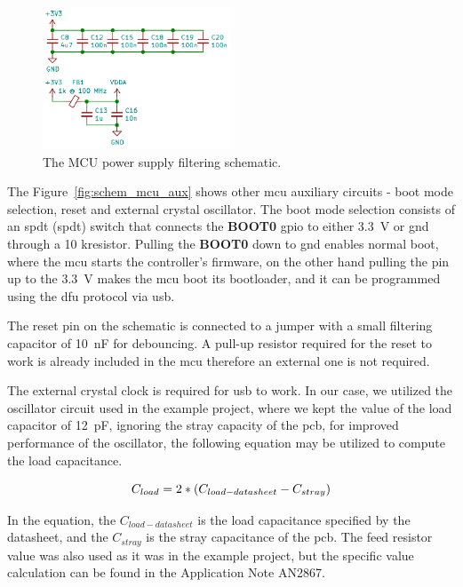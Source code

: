 \begin{figure}[H]
    \centering
    \includegraphics[width=0.5\textwidth]{obrazky/schem_mcu_power_filter}
    \caption{The MCU power supply filtering schematic.}
    \label{fig:schem_mcu_power}
\end{figure}

The Figure~\ref{fig:schem_mcu_aux} shows other \acs{mcu} auxiliary circuits - boot mode selection, reset and external crystal oscillator.
The boot mode selection consists of an \acs{spdt} (\acl{spdt}) switch that connects the \textbf{BOOT0} \acs{gpio} to either 3.3~V or \acs{gnd} through a 10 k\textohm resistor.
Pulling the \textbf{BOOT0} down to \acs{gnd} enables normal boot, where the \acs{mcu} starts the controller's firmware, on the other hand pulling the pin up to the 3.3~V makes the \acs{mcu} boot its bootloader, and it can be programmed using the \acs{dfu} protocol via \acs{usb}.

The reset pin on the schematic is connected to a jumper with a small filtering capacitor of 10~nF for debouncing.
A pull-up resistor required for the reset to work is already included in the \acs{mcu} therefore an external one is not required.

The external crystal clock is required for \acs{usb} to work.
In our case, we utilized the oscillator circuit used in the example project, where we kept the value of the load capacitor of 12~pF, ignoring the stray capacity of the \acs{pcb}, for improved performance of the oscillator, the following equation may be utilized to compute the load capacitance.

\begin{equation}
    \centering
    C_{load} = 2 * (C_{load-{datasheet}} - C_{stray})
    \label{eq:clock_cap}
\end{equation}

In the equation, the $C_{load-{datasheet}}$ is the load capacitance specified by the datasheet, and the $C_{stray}$ is the stray capacitance of the \acs{pcb}.
The feed resistor value was also used as it was in the example project, but the specific value calculation can be found in the Application Note AN2867\cite{stmicro_an2867_2020}.

